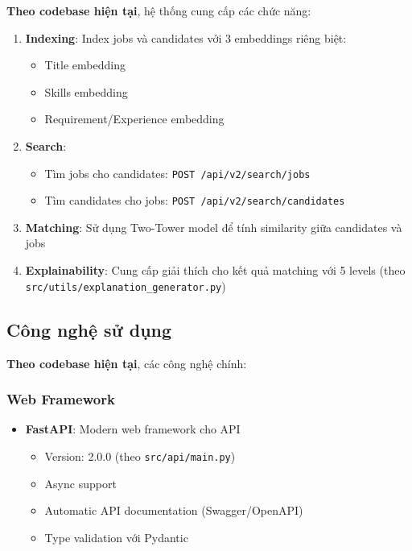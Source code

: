 \textbf{Theo codebase hiện tại}, hệ thống cung cấp các chức năng:

\begin{enumerate}
    \item \textbf{Indexing}: Index jobs và candidates với 3 embeddings riêng biệt:
    \begin{itemize}
        \item Title embedding
        \item Skills embedding
        \item Requirement/Experience embedding
    \end{itemize}
    
    \item \textbf{Search}:
    \begin{itemize}
        \item Tìm jobs cho candidates: \texttt{POST /api/v2/search/jobs}
        \item Tìm candidates cho jobs: \texttt{POST /api/v2/search/candidates}
    \end{itemize}
    
    \item \textbf{Matching}: Sử dụng Two-Tower model để tính similarity giữa candidates và jobs
    
    \item \textbf{Explainability}: Cung cấp giải thích cho kết quả matching với 5 levels (theo \texttt{src/utils/explanation\_generator.py})
\end{enumerate}

\subsection{Công nghệ sử dụng}

\textbf{Theo codebase hiện tại}, các công nghệ chính:

\subsubsection{Web Framework}

\begin{itemize}
    \item \textbf{FastAPI}: Modern web framework cho API
    \begin{itemize}
        \item Version: 2.0.0 (theo \texttt{src/api/main.py})
        \item Async support
        \item Automatic API documentation (Swagger/OpenAPI)
        \item Type validation với Pydantic
    \end{itemize}
\end{itemize}

